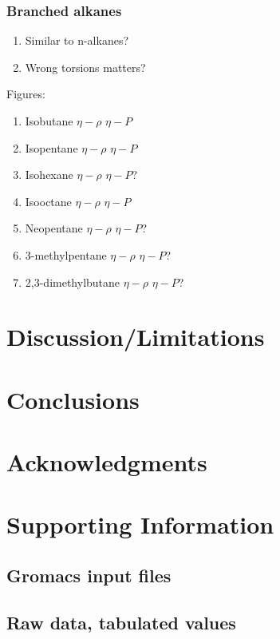\documentclass[11pt,a4paper]{article}
\begin{document}
\subsubsection{Branched alkanes}

\begin{enumerate}
	\item Similar to n-alkanes? 
	\item Wrong torsions matters?
\end{enumerate}

Figures:

\begin{enumerate}
	\item Isobutane $\eta-\rho$ $\eta-P$
	\item Isopentane $\eta-\rho$ $\eta-P$
	\item Isohexane $\eta-\rho$ $\eta-P$?
	\item Isooctane $\eta-\rho$ $\eta-P$
	\item Neopentane $\eta-\rho$ $\eta-P$?
	\item 3-methylpentane $\eta-\rho$ $\eta-P$?
	\item 2,3-dimethylbutane $\eta-\rho$ $\eta-P$?
\end{enumerate}

\section{Discussion/Limitations}



\section{Conclusions}

\section{Acknowledgments}

\section{Supporting Information}

\subsection{Gromacs input files}

\subsection{Raw data, tabulated values}
\end{document}
